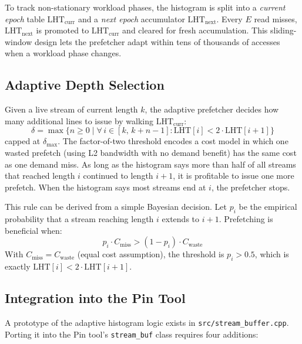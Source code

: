 \documentclass[10pt,twocolumn]{article}
\begin{document}
To track non-stationary workload phases, the histogram is split into a
\textit{current epoch} table $\text{LHT}_\text{curr}$ and a
\textit{next epoch} accumulator $\text{LHT}_\text{next}$. Every $E$
read misses, $\text{LHT}_\text{next}$ is promoted to
$\text{LHT}_\text{curr}$ and cleared for fresh accumulation. This
sliding-window design lets the prefetcher adapt within tens of thousands
of accesses when a workload phase changes.

\subsection{Adaptive Depth Selection}

Given a live stream of current length $k$, the adaptive prefetcher
decides how many additional lines to issue by walking
$\text{LHT}_\text{curr}$:
\[
  \delta = \max \bigl\{ n \ge 0 \;\big|\;
    \forall\, i \in [k,\, k{+}n{-}1]: \text{LHT}[i] < 2 \cdot \text{LHT}[i+1]
  \bigr\}
\]
capped at $\delta_{\max}$. The factor-of-two threshold encodes a
cost model in which one wasted prefetch (using L2 bandwidth with no
demand benefit) has the same cost as one demand miss. As long as the
histogram says more than half of all streams that reached length $i$
continued to length $i+1$, it is profitable to issue one more prefetch.
When the histogram says most streams end at $i$, the prefetcher stops.

This rule can be derived from a simple Bayesian decision. Let $p_i$ be
the empirical probability that a stream reaching length $i$ extends to
$i+1$. Prefetching is beneficial when:
\[
  p_i \cdot C_{\text{miss}} > (1-p_i) \cdot C_{\text{waste}}
\]
With $C_{\text{miss}} = C_{\text{waste}}$ (equal cost assumption), the
threshold is $p_i > 0.5$, which is exactly $\text{LHT}[i] < 2\cdot
\text{LHT}[i+1]$.

\subsection{Integration into the Pin Tool}

A prototype of the adaptive histogram logic exists in
\texttt{src/stream\_buffer.cpp}. Porting it into the Pin tool's
\texttt{stream\_buf} class requires four additions:
\end{document}
